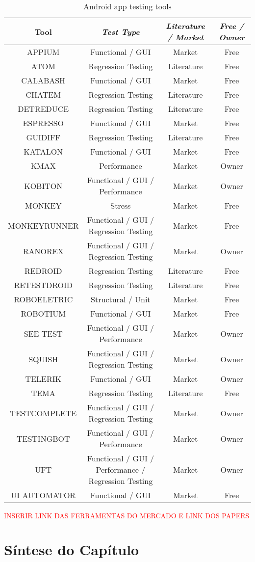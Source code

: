 \begin{table}[th]
\footnotesize
\centering
\caption{Android app testing tools}
\begin{center}
\begin{tabular}{|c|c|c|c|}
\hline
\textbf{Tool} & \textbf{\textit{Test Type}}& \textbf{\textit{Literature / Market}} & \textbf{\textit{Free / Owner}}\\\hline

APPIUM & Functional / GUI & Market & Free\\\hline
ATOM & Regression Testing & Literature & Free\\\hline
CALABASH & Functional / GUI & Market & Free\\\hline
CHATEM & Regression Testing & Literature & Free\\\hline
DETREDUCE & Regression Testing & Literature & Free\\\hline
ESPRESSO & Functional / GUI & Market & Free\\\hline
GUIDIFF & Regression Testing & Literature & Free\\\hline
KATALON & Functional / GUI & Market & Free\\\hline
KMAX & Performance & Market & Owner\\\hline
KOBITON & Functional / GUI / Performance & Market & Owner\\\hline
MONKEY & Stress & Market & Free\\\hline
MONKEYRUNNER & Functional / GUI / Regression Testing & Market & Free\\\hline
RANOREX & Functional / GUI / Regression Testing & Market & Owner\\\hline
REDROID & Regression Testing & Literature & Free\\\hline
RETESTDROID & Regression Testing & Literature & Free\\\hline
ROBOELETRIC & Structural / Unit & Market & Free\\\hline
ROBOTIUM & Functional / GUI & Market & Free\\\hline
SEE TEST & Functional / GUI / Performance & Market & Owner\\\hline
SQUISH & Functional / GUI / Regression Testing & Market & Owner\\\hline
TELERIK & Functional / GUI & Market & Owner\\\hline
TEMA \cite{5770627} & Regression Testing & Literature & Free\\\hline
TESTCOMPLETE & Functional / GUI / Regression Testing & Market & Owner\\\hline
TESTINGBOT & Functional / GUI / Performance & Market & Owner\\\hline
UFT & Functional / GUI / Performance / Regression Testing & Market & Owner\\\hline
UI AUTOMATOR & Functional / GUI & Market & Free\\\hline

\end{tabular}
\label{tab1}
\end{center}
\end{table}
\textcolor{red}{INSERIR LINK DAS FERRAMENTAS DO MERCADO E LINK DOS PAPERS}

\section{Síntese do Capítulo}